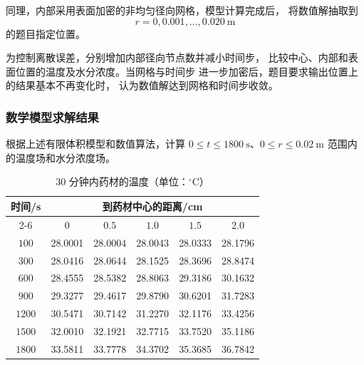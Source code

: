 \documentclass[12pt,a4paper]{article}
\begin{document}
同理，内部采用表面加密的非均匀径向网格，模型计算完成后，
将数值解抽取到
\begin{equation}
r=0,0.001,\ldots,0.020\ \mathrm{m}
\end{equation}
的题目指定位置。

为控制离散误差，分别增加内部径向节点数并减小时间步，
比较中心、内部和表面位置的温度及水分浓度。当网格与时间步
进一步加密后，题目要求输出位置上的结果基本不再变化时，
认为数值解达到网格和时间步收敛。

\subsubsection{数学模型求解结果}

根据上述有限体积模型和数值算法，计算
$0\le t\le1800\ \mathrm{s}$、$0\le r\le0.02\ \mathrm{m}$
范围内的温度场和水分浓度场。

\begin{table}[H]
\centering
\caption{30 分钟内药材的温度（单位：$^\circ$C）}
\label{tab:t}
\begin{tabular}{cccccc}
\toprule
\multirow{2}{*}{时间/s}
& \multicolumn{5}{c}{到药材中心的距离/cm}\\
\cmidrule(lr){2-6}
& $0$ & $0.5$ & $1.0$ & $1.5$ & $2.0$\\
\midrule
$100$  & 28.0001 & 28.0004 & 28.0043 & 28.0333 & 28.1796\\
$300$  & 28.0416 & 28.0644 & 28.1525 & 28.3696 & 28.8474\\
$600$  & 28.4555 & 28.5382 & 28.8063 & 29.3186 & 30.1632\\
$900$  & 29.3277 & 29.4617 & 29.8790 & 30.6201 & 31.7283\\
$1200$ & 30.5471 & 30.7142 & 31.2270 & 32.1176 & 33.4256\\
$1500$ & 32.0010 & 32.1921 & 32.7715 & 33.7520 & 35.1186\\
$1800$ & 33.5811 & 33.7778 & 34.3702 & 35.3685 & 36.7842\\
\bottomrule
\end{tabular}
\end{table}
\end{document}
